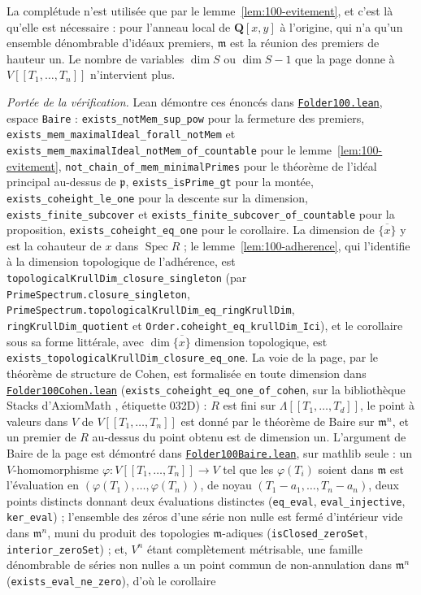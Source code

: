 La complétude n'est utilisée que par le lemme~\ref{lem:100-evitement}, et c'est là qu'elle est nécessaire : pour l'anneau local de $\mathbf Q[x, y]$ à l'origine, qui n'a qu'un ensemble dénombrable d'idéaux premiers, $\mathfrak m$ est la réunion des premiers de hauteur un. Le nombre de variables $\dim S$ ou $\dim S - 1$ que la page donne à $V[[T_1, \ldots, T_n]]$ n'intervient plus.

\begingroup\raggedright
\noindent\emph{Portée de la vérification.} Lean démontre ces énoncés dans \href{\leanblob/RingTheory/Folder100.lean}{\texttt{Folder100.\allowbreak{}lean}}, espace \texttt{Baire} : \texttt{exists\_notMem\_sup\_pow} pour la fermeture des premiers, \texttt{exists\_mem\_maximalIdeal\_forall\_notMem} et \texttt{exists\_mem\_maximalIdeal\_notMem\_of\_countable} pour le lemme~\ref{lem:100-evitement}, \texttt{not\_chain\_of\_mem\_minimalPrimes} pour le théorème de l'idéal principal au-dessus de $\mathfrak p$, \texttt{exists\_isPrime\_gt} pour la montée, \texttt{exists\_coheight\_le\_one} pour la descente sur la dimension, \texttt{exists\_finite\_subcover} et \texttt{exists\_finite\_subcover\_of\_countable} pour la proposition, \texttt{exists\_coheight\_eq\_one} pour le corollaire. La dimension de $\overline{\{x\}}$ y est la cohauteur de $x$ dans $\operatorname{Spec} R$ ; le lemme~\ref{lem:100-adherence}, qui l'identifie à la dimension topologique de l'adhérence, est \texttt{topologicalKrullDim\_closure\_singleton} (par \texttt{PrimeSpectrum.\allowbreak{}closure\_singleton}, \texttt{PrimeSpectrum.\allowbreak{}topologicalKrullDim\_eq\_ringKrullDim}, \texttt{ringKrullDim\_quotient} et \texttt{Order.\allowbreak{}coheight\_eq\_krullDim\_Ici}), et le corollaire sous sa forme littérale, avec $\dim \overline{\{x\}}$ dimension topologique, est \texttt{exists\_topologicalKrullDim\_closure\_eq\_one}. La voie de la page, par le théorème de structure de Cohen, est formalisée en toute dimension dans \href{\leanblobmain/RingTheory/Folder100Cohen.lean}{\texttt{Folder100Cohen.\allowbreak{}lean}} (\texttt{exists\_coheight\_eq\_one\_of\_cohen}, sur la bibliothèque Stacks d'AxiomMath \cite{axiomstacks}, étiquette 032D) : $R$ est fini sur $\Lambda[[T_1, \ldots, T_d]]$, le point à valeurs dans $V$ de $V[[T_1, \ldots, T_n]]$ est donné par le théorème de Baire sur $\mathfrak m^n$, et un premier de $R$ au-dessus du point obtenu est de dimension un. L'argument de Baire de la page est démontré dans \href{\leanblobmain/RingTheory/Folder100Baire.lean}{\texttt{Folder100Baire.\allowbreak{}lean}}, sur mathlib seule : un $V$-homomorphisme $\varphi : V[[T_1, \ldots, T_n]] \to V$ tel que les $\varphi(T_i)$ soient dans $\mathfrak m$ est l'évaluation en $(\varphi(T_1), \ldots, \varphi(T_n))$, de noyau $(T_1 - a_1, \ldots, T_n - a_n)$, deux points distincts donnant deux évaluations distinctes (\texttt{eq\_eval}, \texttt{eval\_injective}, \texttt{ker\_eval}) ; l'ensemble des zéros d'une série non nulle est fermé d'intérieur vide dans $\mathfrak m^n$, muni du produit des topologies $\mathfrak m$-adiques (\texttt{isClosed\_zeroSet}, \texttt{interior\_zeroSet}) ; et, $V^n$ étant complètement métrisable, une famille dénombrable de séries non nulles a un point commun de non-annulation dans $\mathfrak m^n$ (\texttt{exists\_eval\_ne\_zero}), d'où le corollaire 